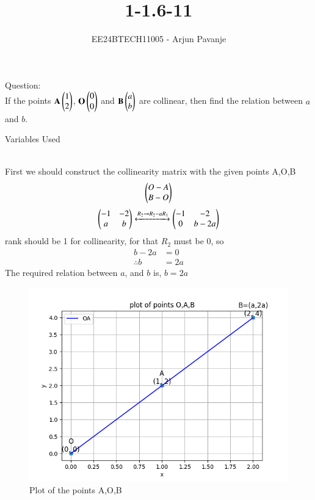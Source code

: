 \documentclass[journal]{IEEEtran}
\begin{document}

\vspace{3cm}

\title{1-1.6-11}
\author{EE24BTECH11005 - Arjun Pavanje
}
{\let\newpage\relax\maketitle}
Question:\\
If the points $\mathbf{A}\begin{pmatrix}1\\ 2\end{pmatrix}$, $\mathbf{O}\begin{pmatrix}0\\ 0\end{pmatrix}$ and $\mathbf{B}\begin{pmatrix}a\\b\end{pmatrix}$ are collinear, then find the relation between
$a$ and $b$.
\\
\solution
\begin{table}[h!]    
  \centering
  
  \caption{Variables Used}
  \label{tab1-1.5-29}
\end{table}\\
First we should construct the collinearity matrix with the given points A,O,B
\begin{align}
\begin{pmatrix}
O-A \\
B-O
\end{pmatrix}
\end{align}
\begin{align}
\begin{pmatrix}
-1 & -2\\
a & b
\end{pmatrix}
\xleftrightarrow[]{R_2 \rightarrow {R_2-aR_1}}
\begin{pmatrix}
-1 & -2\\
0 & b-2a
\end{pmatrix}
\end{align}
rank should be 1 for collinearity, for that $R_2$ must be 0, so
\begin{align}
	b-2a&=0\\
	\therefore b&=2a
\end{align}
The required relation between $a$, and $b$ is, $b=2a$
\begin{figure}[h!]
   \centering
   \includegraphics[width=0.7\linewidth]{figs/fig.png}
   \caption{Plot of the points A,O,B}
   \label{stemplot}
\end{figure}
\end{document}
